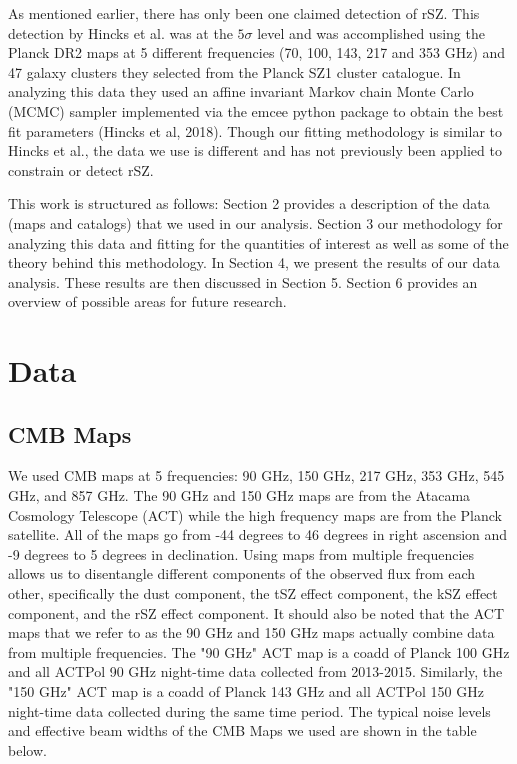 \documentclass{princeton_astro_thesis}
\begin{document}
\par As mentioned earlier, there has only been one claimed detection of rSZ. This detection by Hincks et al. was at the $5\sigma$ level and was accomplished using the Planck DR2 maps at 5 different frequencies (70, 100,
143, 217 and 353 GHz) and 47 galaxy clusters they selected from the Planck SZ1 cluster catalogue. In analyzing this data they used an affine invariant Markov chain Monte Carlo (MCMC) sampler implemented via the emcee python package to obtain the best fit parameters (Hincks et al, 2018). Though our fitting methodology is similar to Hincks et al., the data we use is different and has not previously been applied to constrain or detect rSZ.
\par This work is structured as follows: Section 2 provides a description of the data (maps and catalogs) that we used in our analysis. Section 3 our methodology for analyzing this data and fitting for the quantities of interest as well as some of the theory behind this methodology. In Section 4, we present the results of our data analysis. These results are then discussed in Section 5. Section 6 provides an overview of possible areas for future research. 


\chapter{Data}
\section{CMB Maps}
We used CMB maps at 5 frequencies: 90 GHz, 150 GHz, 217 GHz, 353 GHz, 545 GHz, and 857 GHz. The 90 GHz and 150 GHz maps are from the Atacama Cosmology Telescope (ACT) while the high frequency maps are from the Planck satellite. All of the maps go from -44 degrees to 46 degrees in right ascension and -9 degrees to 5 degrees in declination. Using maps from multiple frequencies allows us to disentangle different components of the observed flux from each other, specifically the dust component, the tSZ effect component, the kSZ effect component, and the rSZ effect component. It should also be noted that the ACT maps that we refer to as the  90 GHz and 150 GHz maps actually combine data from multiple frequencies. The "90 GHz" ACT map is a coadd of Planck 100 GHz and all ACTPol 90 GHz night-time data collected from 2013-2015. Similarly, the "150 GHz" ACT map is a coadd of Planck 143 GHz and all ACTPol 150 GHz night-time data collected during the same time period. The typical noise levels and effective beam widths of the CMB Maps we used are shown in the table below.%
\end{document}
